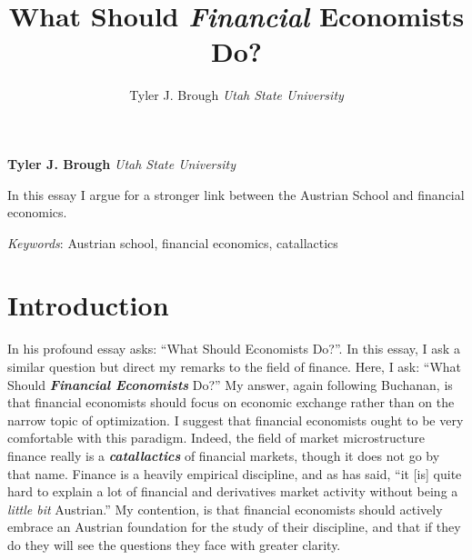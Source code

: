 \documentclass[11pt,]{article}
\title{What Should \emph{Financial} Economists Do?  }
\author{\Large Tyler J. Brough\vspace{0.05in} \newline\normalsize\emph{Utah State University}  }
\date{}
\newcommand*{\authorfont}{\fontfamily{phv}\selectfont}
\renewenvironment{abstract}
 {{%
    \setlength{\leftmargin}{0mm}
    \setlength{\rightmargin}{\leftmargin}%
  }%
  \relax}
 {\endlist}
\begin{document}
	
%

{%
\setlength{\parindent}{0pt}
\thispagestyle{plain}
{\fontsize{18}{20}\selectfont\raggedright 
\maketitle  %

}

{
   \vskip 13.5pt\relax \normalsize\fontsize{11}{12} 
\textbf{\authorfont Tyler J. Brough} \hskip 15pt \emph{\small Utah State University}   

}

}







\begin{abstract}

    \hbox{\vrule height .2pt width 39.14pc}

    \vskip 8.5pt %

\noindent In this essay I argue for a stronger link between the Austrian School
and financial economics.


\vskip 8.5pt \noindent \emph{Keywords}: Austrian school, financial economics, catallactics \par

    \hbox{\vrule height .2pt width 39.14pc}



\end{abstract}


\vskip 6.5pt

\noindent \doublespacing \section{Introduction}\label{introduction}

In his profound essay \citet{Buchanan1964} asks: ``What Should
Economists Do?''. In this essay, I ask a similar question but direct my
remarks to the field of finance. Here, I ask: ``What Should
\textbf{\emph{Financial Economists}} Do?'' My answer, again following
Buchanan, is that financial economists should focus on economic exchange
rather than on the narrow topic of optimization. I suggest that
financial economists ought to be very comfortable with this paradigm.
Indeed, the field of market microstructure finance really is a
\textbf{\emph{catallactics}} of financial markets, though it does not go
by that name. Finance is a heavily empirical discipline, and as
\citet{Culp2004} has said, ``it {[}is{]} quite hard to explain a lot of
financial and derivatives market activity without being a \emph{little
bit} Austrian.'' My contention, is that financial economists should
actively embrace an Austrian foundation for the study of their
discipline, and that if they do they will see the questions they face
with greater clarity.
\end{document}
